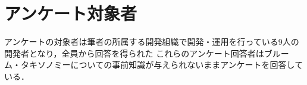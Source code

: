 \section{アンケート対象者}
アンケートの対象者は筆者の所属する開発組織で開発・運用を行っている9人の開発者となり，全員から回答を得られた
これらのアンケート回答者はブルーム・タキソノミーについての事前知識が与えられないままアンケートを回答している．
